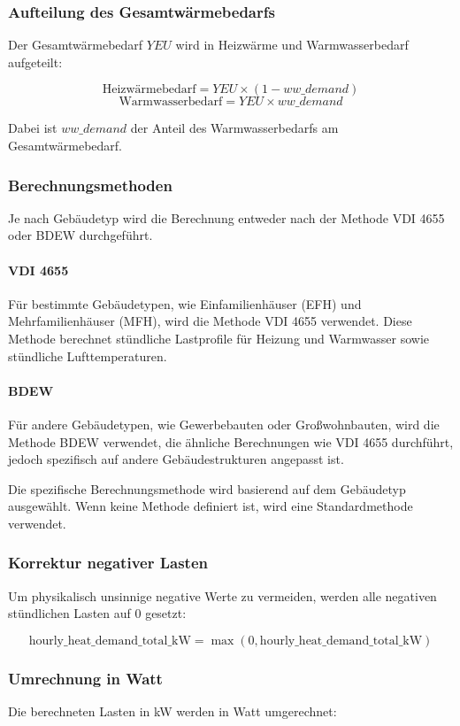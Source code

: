\documentclass[a4paper,12pt]{article}
\begin{document}
\subsubsection{Aufteilung des Gesamtwärmebedarfs}

Der Gesamtwärmebedarf \( YEU \) wird in Heizwärme und Warmwasserbedarf aufgeteilt:

\[
\text{Heizwärmebedarf} = YEU \times (1 - ww\_demand)
\]
\[
\text{Warmwasserbedarf} = YEU \times ww\_demand
\]

Dabei ist \( ww\_demand \) der Anteil des Warmwasserbedarfs am Gesamtwärmebedarf.

\subsubsection{Berechnungsmethoden}
Je nach Gebäudetyp wird die Berechnung entweder nach der Methode VDI 4655 oder BDEW durchgeführt.

\paragraph{VDI 4655}
Für bestimmte Gebäudetypen, wie Einfamilienhäuser (EFH) und Mehrfamilienhäuser (MFH), wird die Methode VDI 4655 verwendet. Diese Methode berechnet stündliche Lastprofile für Heizung und Warmwasser sowie stündliche Lufttemperaturen.

\paragraph{BDEW}
Für andere Gebäudetypen, wie Gewerbebauten oder Großwohnbauten, wird die Methode BDEW verwendet, die ähnliche Berechnungen wie VDI 4655 durchführt, jedoch spezifisch auf andere Gebäudestrukturen angepasst ist.

Die spezifische Berechnungsmethode wird basierend auf dem Gebäudetyp ausgewählt. Wenn keine Methode definiert ist, wird eine Standardmethode verwendet.

\subsubsection{Korrektur negativer Lasten}
Um physikalisch unsinnige negative Werte zu vermeiden, werden alle negativen stündlichen Lasten auf 0 gesetzt:

\[
\text{hourly\_heat\_demand\_total\_kW} = \max(0, \text{hourly\_heat\_demand\_total\_kW})
\]

\subsubsection{Umrechnung in Watt}
Die berechneten Lasten in kW werden in Watt umgerechnet:
\end{document}
